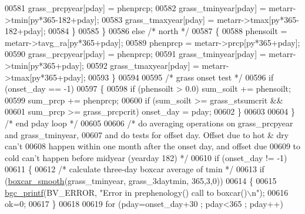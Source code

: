 \begin{DoxyCode}
{{{00581                             grass\_prcpyear[pday] = phenprcp;
00582                             grass\_tminyear[pday] = metarr->tmin[py*365-182+pday];
00583                             grass\_tmaxyear[pday] = metarr->tmax[py*365-182+pday];
00584                         \}
00585                     \}
00586                     \textcolor{keywordflow}{else} \textcolor{comment}{/* north */}
00587                     \{
00588                         phensoilt = metarr->tavg\_ra[py*365+pday];
00589                         phenprcp = metarr->prcp[py*365+pday];
00590                         grass\_prcpyear[pday] = phenprcp;
00591                         grass\_tminyear[pday] = metarr->tmin[py*365+pday];
00592                         grass\_tmaxyear[pday] = metarr->tmax[py*365+pday];
00593                     \}
00594                     
00595                     \textcolor{comment}{/* grass onset test */}
00596                     \textcolor{keywordflow}{if} (onset\_day == -1)
00597                     \{
00598                         \textcolor{keywordflow}{if} (phensoilt > 0.0) sum\_soilt += phensoilt;
00599                         sum\_prcp += phenprcp;
00600                         \textcolor{keywordflow}{if} (sum\_soilt >= grass\_stsumcrit &&
00601                             sum\_prcp >= grass\_prcpcrit) onset\_day = pday;
00602                     \}
00603                     
00604                 \} \textcolor{comment}{/* end pday loop */}
00605                 
00606                 \textcolor{comment}{/* do averaging operations on grass\_prcpyear and grass\_tminyear,}
00607 \textcolor{comment}{                and do tests for offset day. Offset due to hot & dry can't}
00608 \textcolor{comment}{                happen within one month after the onset day, and offset due}
00609 \textcolor{comment}{                to cold can't happen before midyear (yearday 182) */}
00610                 \textcolor{keywordflow}{if} (onset\_day != -1)
00611                 \{
00612                     \textcolor{comment}{/* calculate three-day boxcar average of tmin */}
00613                     \textcolor{keywordflow}{if} (\hyperlink{smooth_8c_ac9c8750166146d2aa5f25c38e3451e9f}{boxcar\_smooth}(grass\_tminyear, grass\_3daytmin, 365,3,0))
00614                     \{
00615                         \hyperlink{bgc__io_8c_af287cce6e2aede1ce337de9319e80d0d}{bgc\_printf}(BV\_ERROR, \textcolor{stringliteral}{"Error in prephenology() call to boxcar()\(\backslash\)n"});
00616                         ok=0;
00617                     \}
00618                     
00619                     \textcolor{keywordflow}{for} (pday=onset\_day+30 ; pday<365 ; pday++)
}}}
\end{DoxyCode}

